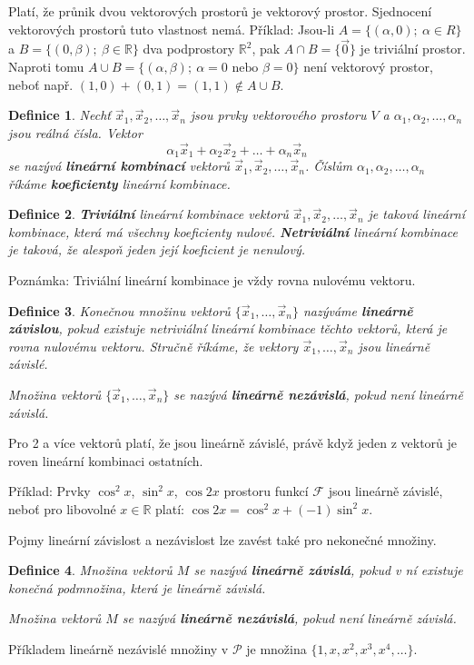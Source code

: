 \documentclass{article}
\newtheorem{df}{Definice}
\newcommand{\0}{\vec{0}}
\newcommand{\R}{\mathbb R}
\newcommand{\xx}{\vec{x}}
\begin{document}
Platí, že průnik dvou vektorových prostorů je vektorový prostor.
Sjednocení vektorových prostorů tuto vlastnost nemá.
Příklad: Jsou-li $A=\{(\alpha,0);~\alpha\in R\}$ a $B=\{(0,\beta);~\beta\in\R\}$ dva podprostory $\R^2$, pak $A\cap B=\{\0\}$ je triviální prostor.
Naproti tomu $A\cup B=\{(\alpha,\beta);~\alpha=0\mbox{ nebo }\beta=0\}$ není vektorový prostor, neboť např. $(1,0)+(0,1)=(1,1)\notin A\cup B$.

\begin{df}
Nechť $\xx_1,\xx_2,\ldots,\xx_n$ jsou prvky vektorového prostoru $V$ a $\alpha_1,\alpha_2,\ldots,\alpha_n$ jsou reálná čísla.
Vektor
$$ \alpha_1\xx_1+\alpha_2\xx_2+\ldots+\alpha_n\xx_n $$
se nazývá {\bf lineární kombinací} vektorů $\xx_1,\xx_2,\ldots,\xx_n$.
Číslům $\alpha_1,\alpha_2,\ldots,\alpha_n$ říkáme {\bf koeficienty} lineární kombinace.
\end{df}

\begin{df}
{\bf Triviální} lineární kombinace vektorů $\xx_1,\xx_2,\ldots,\xx_n$ je taková lineární kombinace, která má všechny koeficienty nulové.
{\bf Netriviální} lineární kombinace je taková, že alespoň jeden její koeficient je nenulový.
\end{df}

Poznámka: Triviální lineární kombinace je vždy rovna nulovému vektoru.

\begin{df}
Konečnou množinu vektorů $\{\xx_1,\ldots,\xx_n\}$ nazýváme {\bf lineárně závislou}, pokud existuje netriviální lineární kombinace těchto vektorů, která je rovna nulovému vektoru. Stručně říkáme, že vektory $\xx_1,\ldots,\xx_n$ jsou lineárně závislé.

Množina vektorů $\{\xx_1,\ldots,\xx_n\}$ se nazývá {\bf lineárně nezávislá}, pokud není lineárně závislá.
\end{df}

Pro 2 a více vektorů platí, že jsou lineárně závislé, právě když jeden z vektorů je roven lineární kombinaci ostatních.

Příklad: Prvky $\cos^2x$, $\sin^2x$, $\cos2x$ prostoru funkcí $\mathcal F$ jsou lineárně závislé, neboť pro libovolné $x\in\R$ platí: $\cos2x=\cos^2x+(-1)\sin^2x$.

Pojmy lineární závislost a nezávislost lze zavést také pro nekonečné množiny.
\begin{df}
Množina vektorů $M$ se nazývá {\bf lineárně závislá}, pokud v ní existuje \emph{konečná} podmnožina, která je lineárně závislá.

Množina vektorů $M$ se nazývá {\bf lineárně nezávislá}, pokud není lineárně závislá.
\end{df}
Příkladem lineárně nezávislé množiny v $\mathcal P$ je množina $\{1,x,x^2,x^3,x^4,\ldots\}$.
\end{document}
